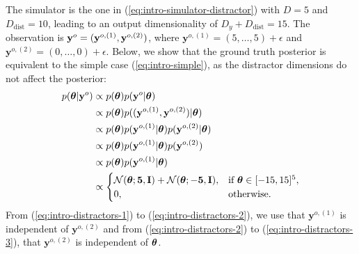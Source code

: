 The simulator is the one in (\ref{eq:intro-simulator-distractor}) with $D = 5$ and $D_{\text{dist}} = 10$, leading to an output dimensionality of $D_y + D_{\text{dist}} = 15$.
The observation is $\mathbf{y}^o = (\mathbf{y}^{o,(1)}, \mathbf{y}^{o,(2)})$,
where
$\mathbf{y}^{o,(1)} = (5, \ldots, 5) + \epsilon$
and
$\mathbf{y}^{o,(2)} = (0, \ldots, 0) + \epsilon$.
Below, we show that the ground truth posterior is equivalent to the simple case (\ref{eq:intro-simple}), as the distractor dimensions do not affect the posterior:
%
\begin{align}
  p(\boldsymbol{\theta} | \mathbf{y}^o)
  &\propto p(\boldsymbol{\theta}) p(\mathbf{y}^o | \boldsymbol{\theta}) \\
  &\propto p(\boldsymbol{\theta}) p((\mathbf{y}^{o,(1)}, \mathbf{y}^{o,(2)}) | \boldsymbol{\theta}) \label{eq:intro-distractors-1} \\
  &\propto p(\boldsymbol{\theta}) p(\mathbf{y}^{o,(1)} | \boldsymbol{\theta}) p(\mathbf{y}^{o,(2)} | \boldsymbol{\theta}) \label{eq:intro-distractors-2} \\
  &\propto p(\boldsymbol{\theta}) p(\mathbf{y}^{o,(1)} | \boldsymbol{\theta}) p(\mathbf{y}^{o,(2)}) \label{eq:intro-distractors-3} \\
  &\propto p(\boldsymbol{\theta}) p(\mathbf{y}^{o,(1)} | \boldsymbol{\theta}) \\
  &\propto
  \begin{cases}
    \mathcal{N}(\boldsymbol{\theta}; \mathbf{5}, \mathbf{I}) + \mathcal{N}(\boldsymbol{\theta}; -\mathbf{5}, \mathbf{I}), & \text{if } \boldsymbol{\theta} \in [-15, 15]^5, \\
    0, & \text{otherwise}.
  \end{cases}
  \label{eq:intro-distractors}
\end{align}
%
From (\ref{eq:intro-distractors-1}) to (\ref{eq:intro-distractors-2}), we use that $\mathbf{y}^{o,(1)}$ is independent of $\mathbf{y}^{o,(2)}$ and
from (\ref{eq:intro-distractors-2}) to (\ref{eq:intro-distractors-3}), that $\mathbf{y}^{o,(2)}$ is independent of $\boldsymbol{\theta}$.


